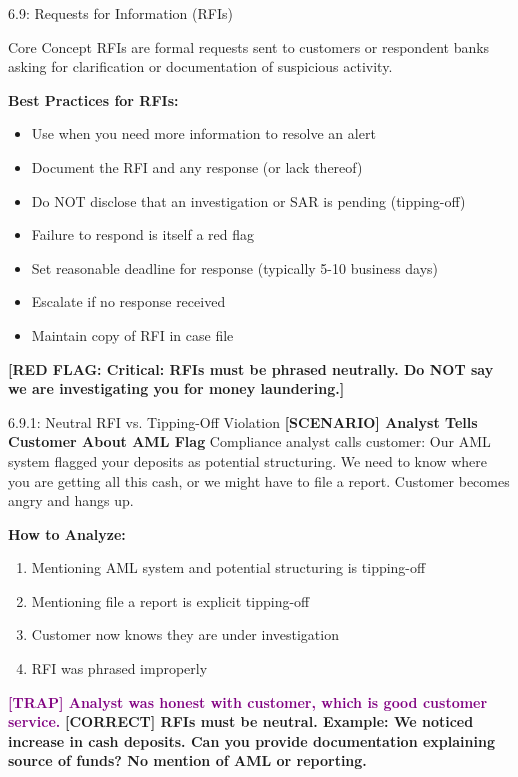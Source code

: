 \documentclass[11pt,a4paper]{beamer}
\newcommand{\trap}[1]{\textcolor{purple}{\textbf{[TRAP] #1}}}
\newcommand{\correct}[1]{\textcolor{green!50!black}{\textbf{[CORRECT] #1}}}
\newcommand{\scenario}[1]{\textcolor{blue!70!black}{\textbf{[SCENARIO] #1}}}
\newcommand{\redflag}[1]{\textcolor{red!80!black}{\textbf{[RED FLAG: #1]}}}
\begin{document}
\begin{frame}{6.9: Requests for Information (RFIs)}
	\begin{block}{Core Concept}
		RFIs are formal requests sent to customers or respondent banks asking for clarification or documentation of suspicious activity.
	\end{block}
	\textbf{Best Practices for RFIs:}
	\begin{itemize}
		\item Use when you need more information to resolve an alert
		\item Document the RFI and any response (or lack thereof)
		\item Do NOT disclose that an investigation or SAR is pending (tipping-off)
		\item Failure to respond is itself a red flag
		\item Set reasonable deadline for response (typically 5-10 business days)
		\item Escalate if no response received
		\item Maintain copy of RFI in case file
	\end{itemize}
	\redflag{Critical: RFIs must be phrased neutrally. Do NOT say we are investigating you for money laundering.}
\end{frame}

\begin{frame}{6.9.1: Neutral RFI vs. Tipping-Off Violation}
	\scenario{Analyst Tells Customer About AML Flag}
	Compliance analyst calls customer: Our AML system flagged your deposits as potential structuring. We need to know where you are getting all this cash, or we might have to file a report. Customer becomes angry and hangs up.
	
	\vspace{0.1cm}
	\textbf{How to Analyze:}
	\begin{enumerate}
		\item Mentioning AML system and potential structuring is tipping-off
		\item Mentioning file a report is explicit tipping-off
		\item Customer now knows they are under investigation
		\item RFI was phrased improperly
	\end{enumerate}
	\trap{Analyst was honest with customer, which is good customer service.}
	\correct{RFIs must be neutral. Example: We noticed increase in cash deposits. Can you provide documentation explaining source of funds? No mention of AML or reporting.}
\end{frame}
\end{document}
